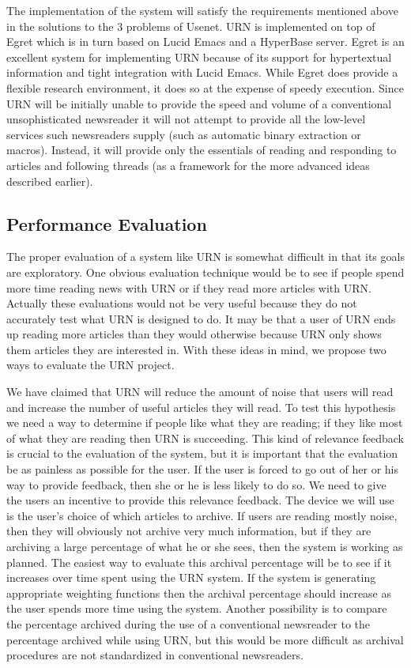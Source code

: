 The implementation of the system will satisfy the requirements mentioned
above in the solutions to the 3 problems of Usenet. URN is implemented on
top of Egret which is in turn based on Lucid Emacs and a HyperBase server.
Egret is an excellent system for implementing URN because of its support for
hypertextual information and tight integration with Lucid Emacs. While Egret
does provide a flexible research environment, it does so at the expense of
speedy execution. Since URN will be initially unable to provide the speed
and volume of a conventional unsophisticated newsreader it will not attempt
to provide all the low-level services such newsreaders supply (such as
automatic binary extraction or macros). Instead, it will provide only the
essentials of reading and responding to articles and following threads (as a
framework for the more advanced ideas described earlier).

\subsection{Performance Evaluation} 

The proper evaluation of a system like URN is somewhat difficult in that its
goals are exploratory. One obvious evaluation technique would be to see if
people spend more time reading news with URN or if they read more articles
with URN. Actually these evaluations would not be very useful because they
do not accurately test what URN is designed to do. It may be that a user of
URN ends up reading more articles than they would otherwise because URN only
shows them articles they are interested in. With these ideas in mind, we
propose two ways to evaluate the URN project.

We have claimed that URN will reduce the amount of noise that users will read
and increase the number of useful articles they will read. To test this
hypothesis we need a way to determine if people like what they are reading;
if they like most of what they are reading then URN is succeeding. This kind
of relevance feedback is crucial to the evaluation of the system, but it is
important that the evaluation be as painless as possible for the user. If
the user is forced to go out of her or his way to provide feedback, then she
or he is less likely to do so. We need to give the users an incentive to
provide this relevance feedback. The device we will use is the user's choice
of which articles to archive. If users are reading mostly noise, then they
will obviously not archive very much information, but if they are
archiving a large percentage of what he or she sees, then the system is
working as planned. The easiest way to evaluate this archival percentage
will be to see if it increases over time spent using the URN system. If the
system is generating appropriate weighting functions then the archival
percentage should increase as the user spends more time using the system.
Another possibility is to compare the percentage archived during the use of
a conventional newsreader to the percentage archived while using URN, but
this would be more difficult as archival procedures are not standardized in
conventional newsreaders.


